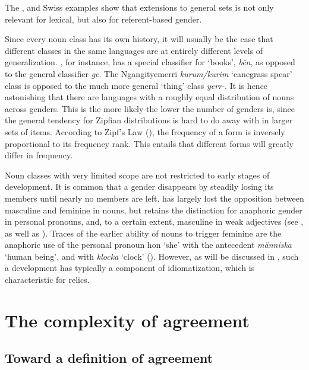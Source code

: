 \documentclass[output=collectionpaper]{langsci/langscibook}
\begin{document}
The ,  and Swiss  examples show that extensions to general sets is not only relevant for lexical, but also for referent-based gender.

Since every noun class has its own history, it will usually be the case that different classes in the same languages are at entirely different levels of generalization. , for instance, has a special classifier for `books', \textit{běn}, as opposed to the general classifier \textit{ge}. The Ngan\textquotesingle{}gityemerri \textit{kurum/kurim} `canegrass spear' class is opposed to the much more general `thing' class \textit{yerr-}. It is hence astonishing that there are languages with a roughly equal distribution of nouns across genders. This is the more likely the lower the number of genders is, since the general tendency for Zipfian distributions is hard to do away with in larger sets of items. According to Zipf's Law (\citealt*{Zipf1935}), the frequency of a form is inversely proportional to its frequency rank. This entails that different forms will greatly differ in frequency.

Noun classes with very limited scope are not restricted to early stages of development. It is common that a gender disappears by steadily losing its members until nearly no members are left.  has largely lost the opposition between masculine and feminine in nouns, but retains the distinction for anaphoric gender in personal pronouns, and, to a certain extent, masculine in weak adjectives (see \citealt{Dahl2000}, as well as ). Traces of the earlier ability of nouns to trigger feminine are the anaphoric use of the personal pronoun hon `she' with the antecedent \textit{människa} `human being', and with \textit{klocka} `clock' (\citealt[61]{Teleman1999}). However, as will be discussed in , such a development has typically a component of idiomatization, which is characteristic for relics.


\section{The complexity of agreement}
\label{sec:WDG:7}

  \subsection{Toward a definition of agreement}
\label{sec:WDG:7.1}
\end{document}
